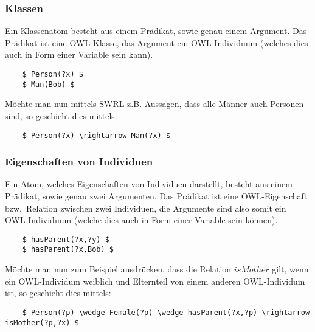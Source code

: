 \subsubsection{Klassen}
\label{ssubsec:swrl_aufbau_atomaretypen_klassen}
Ein Klassenatom besteht aus einem Prädikat, sowie genau einem Argument. Das Prädikat ist eine OWL-Klasse, das Argument ein OWL-Individuum (welches dies auch in Form einer Variable sein kann).
\lstset{language=XML}
\begin{lstlisting}
    $ Person(?x) $
    $ Man(Bob) $
\end{lstlisting}

Möchte man nun mittels SWRL z.B. Aussagen, dass alle Männer auch Personen sind, so geschieht dies mittels:
\lstset{language=XML}
\begin{lstlisting}
    $ Person(?x) \rightarrow Man(?x) $
\end{lstlisting}

\subsubsection{Eigenschaften von Individuen}
\label{ssubsec:swrl_aufbau_atomaretypen_eigenschaftenvonindividuen}
Ein Atom, welches Eigenschaften von Individuen darstellt, besteht aus einem Prädikat, sowie genau zwei Argumenten. Das Prädikat ist eine OWL-Eigenschaft bzw.\ Relation zwischen zwei Individuen, die Argumente sind also somit ein OWL-Individuum (welche dies auch in Form einer Variable sein können).
\lstset{language=XML}
\begin{lstlisting}
    $ hasParent(?x,?y) $
    $ hasParent(?x,Bob) $
\end{lstlisting}

Möchte man nun zum Beispiel ausdrücken, dass die Relation $ isMother $ gilt, wenn ein OWL-Individum weiblich und Elternteil von einem anderen OWL-Individum ist, so geschieht dies mittels:
\lstset{language=XML}
\begin{lstlisting}
    $ Person(?p) \wedge Female(?p) \wedge hasParent(?x,?p) \rightarrow isMother(?p,?x) $
\end{lstlisting}

